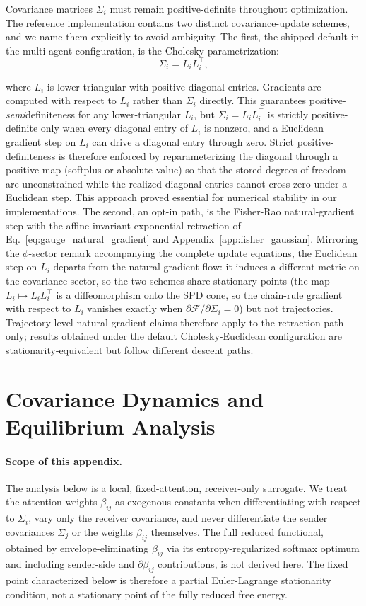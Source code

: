 \documentclass[11pt]{article}
\begin{document}
Covariance matrices $\Sigma_i$ must remain positive-definite throughout optimization. The reference implementation contains two distinct covariance-update schemes, and we name them explicitly to avoid ambiguity. The first, the shipped default in the multi-agent configuration, is the Cholesky parametrization:
\begin{equation}
\Sigma_i = L_i L_i^\top,
\end{equation}

where $L_i$ is lower triangular with positive diagonal entries. Gradients are computed with respect to $L_i$ rather than $\Sigma_i$ directly. This guarantees positive-\emph{semi}definiteness for any lower-triangular $L_i$, but $\Sigma_i = L_iL_i^\top$ is strictly positive-definite only when every diagonal entry of $L_i$ is nonzero, and a Euclidean gradient step on $L_i$ can drive a diagonal entry through zero. Strict positive-definiteness is therefore enforced by reparameterizing the diagonal through a positive map (softplus or absolute value) so that the stored degrees of freedom are unconstrained while the realized diagonal entries cannot cross zero under a Euclidean step. This approach proved essential for numerical stability in our implementations. The second, an opt-in path, is the Fisher-Rao natural-gradient step with the affine-invariant exponential retraction of Eq.~\eqref{eq:gauge_natural_gradient} and Appendix~\ref{app:fisher_gaussian}. Mirroring the $\phi$-sector remark accompanying the complete update equations, the Euclidean step on $L_i$ departs from the natural-gradient flow: it induces a different metric on the covariance sector, so the two schemes share stationary points (the map $L_i \mapsto L_iL_i^\top$ is a diffeomorphism onto the SPD cone, so the chain-rule gradient with respect to $L_i$ vanishes exactly when $\partial\mathcal{F}/\partial\Sigma_i = 0$) but not trajectories. Trajectory-level natural-gradient claims therefore apply to the retraction path only; results obtained under the default Cholesky-Euclidean configuration are stationarity-equivalent but follow different descent paths.

\section{Covariance Dynamics and Equilibrium Analysis}
\label{app:covariance_dynamics}

\paragraph{Scope of this appendix.}
The analysis below is a local, fixed-attention, receiver-only surrogate. We treat the attention weights $\beta_{ij}$ as exogenous constants when differentiating with respect to $\Sigma_i$, vary only the receiver covariance, and never differentiate the sender covariances $\Sigma_j$ or the weights $\beta_{ij}$ themselves. The full reduced functional, obtained by envelope-eliminating $\beta_{ij}$ via its entropy-regularized softmax optimum and including sender-side and $\partial \beta_{ij}$ contributions, is not derived here. The fixed point characterized below is therefore a partial Euler-Lagrange stationarity condition, not a stationary point of the fully reduced free energy.
\end{document}
